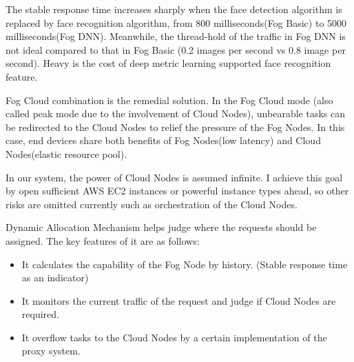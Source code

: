 The stable response time increases sharply when the face detection algorithm is replaced by face recognition algorithm, from 800 milliseconds(Fog Basic) to 5000 milliseconds(Fog DNN). Meanwhile, the thread-hold of the traffic in Fog DNN is not ideal compared to that in Fog Basic (0.2 images per second vs 0.8 image per second). Heavy is the cost of deep metric learning supported face recognition feature.

Fog Cloud combination is the remedial solution. In the Fog Cloud mode (also called peak mode due to the involvement of Cloud Nodes), unbearable tasks can be redirected to the Cloud Nodes to relief the pressure of the Fog Nodes. In this case, end devices share both benefits of Fog Nodes(low latency) and Cloud Nodes(elastic resource pool). 

In our system, the power of Cloud Nodes is assumed infinite. I achieve this goal by open sufficient AWS EC2 instances or powerful instance types ahead, so other risks are omitted currently such as orchestration of the Cloud Nodes.

Dynamic Allocation Mechanism helps judge where the requests should be assigned. The key features of it are as follows:
\begin{itemize}
    \item It calculates the capability of the Fog Node by history. (Stable response time as an indicator)
    \item It monitors the current traffic of the request and judge if Cloud Nodes are required.
    \item It overflow tasks to the Cloud Nodes by a certain implementation of the proxy system.
\end{itemize}